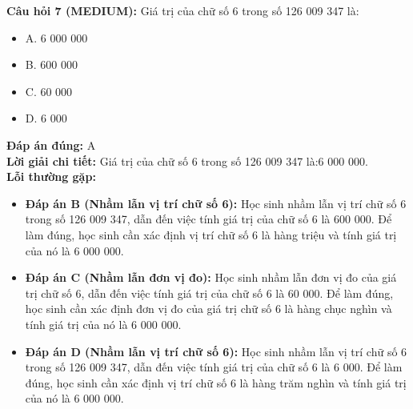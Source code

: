 \documentclass{article}
\begin{document}
\begin{minipage}{\textwidth}
\noindent\textbf{Câu hỏi 7 (MEDIUM):} Giá trị của chữ số 6 trong số 126 009 347 là: 
\begin{itemize}[label={}]
    \item A. 6 000 000
    \item B. 600 000
    \item C. 60 000
    \item D. 6 000
\end{itemize}
\textbf{Đáp án đúng:} A \\
\textbf{Lời giải chi tiết:} Giá trị của chữ số 6 trong số 126 009 347 là:6 000 000. \\
\textbf{Lỗi thường gặp:}
\begin{itemize}
  \item \textbf{Đáp án B (Nhầm lẫn vị trí chữ số 6):} Học sinh nhầm lẫn vị trí chữ số 6 trong số 126 009 347, dẫn đến việc tính giá trị của chữ số 6 là 600 000. Để làm đúng, học sinh cần xác định vị trí chữ số 6 là hàng triệu và tính giá trị của nó là 6 000 000.
  \item \textbf{Đáp án C (Nhầm lẫn đơn vị đo):} Học sinh nhầm lẫn đơn vị đo của giá trị chữ số 6, dẫn đến việc tính giá trị của chữ số 6 là 60 000. Để làm đúng, học sinh cần xác định đơn vị đo của giá trị chữ số 6 là hàng chục nghìn và tính giá trị của nó là 6 000 000.
  \item \textbf{Đáp án D (Nhầm lẫn vị trí chữ số 6):} Học sinh nhầm lẫn vị trí chữ số 6 trong số 126 009 347, dẫn đến việc tính giá trị của chữ số 6 là 6 000. Để làm đúng, học sinh cần xác định vị trí chữ số 6 là hàng trăm nghìn và tính giá trị của nó là 6 000 000.
\end{itemize}
\end{minipage}
\vspace{1em}
\end{document}
